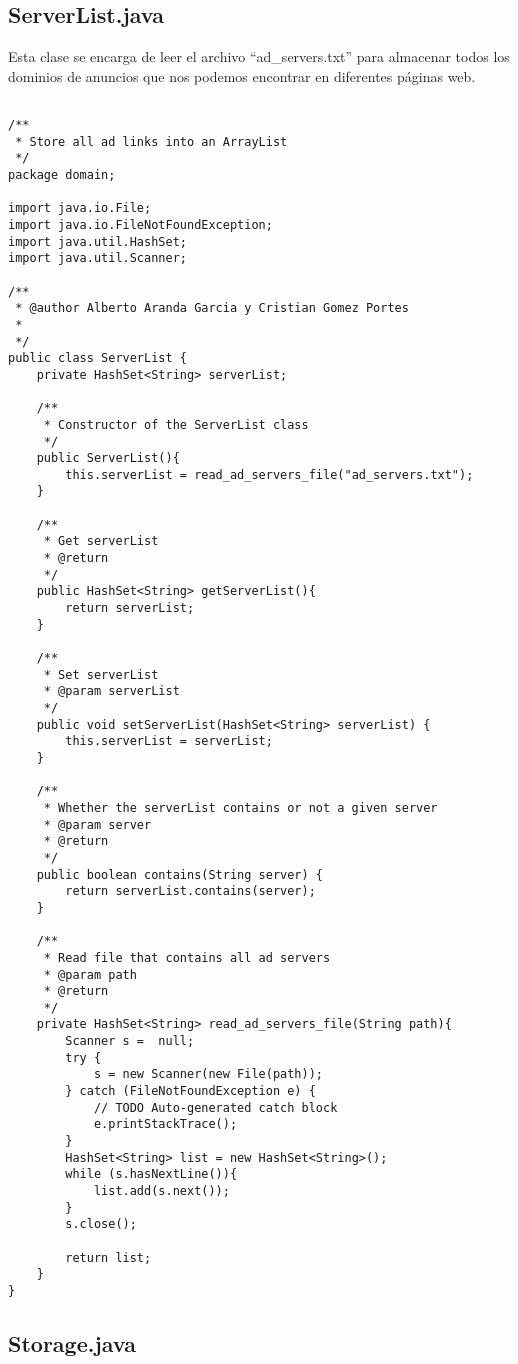 \documentclass{pre-tfg}
\begin{document}
\subsection{ServerList.java}

Esta clase se encarga de leer el archivo ``ad\_servers.txt'' para almacenar todos los dominios de anuncios que nos podemos encontrar
en diferentes páginas web.

\begin{lstlisting}[caption=Código de lectura e inserción de dominios de anuncios,style=java]

/**
 * Store all ad links into an ArrayList
 */
package domain;

import java.io.File;
import java.io.FileNotFoundException;
import java.util.HashSet;
import java.util.Scanner;

/**
 * @author Alberto Aranda Garcia y Cristian Gomez Portes
 *
 */
public class ServerList {
	private HashSet<String> serverList;
	
	/**
	 * Constructor of the ServerList class
	 */
	public ServerList(){
		this.serverList = read_ad_servers_file("ad_servers.txt");
	}
	
	/**
	 * Get serverList
	 * @return
	 */
	public HashSet<String> getServerList(){
		return serverList;
	}
	
	/**
	 * Set serverList
	 * @param serverList
	 */
	public void setServerList(HashSet<String> serverList) {
		this.serverList = serverList;
	}
	
	/**
	 * Whether the serverList contains or not a given server
	 * @param server
	 * @return
	 */
	public boolean contains(String server) {
		return serverList.contains(server);
	}
	
	/**
	 * Read file that contains all ad servers
	 * @param path
	 * @return
	 */
	private HashSet<String> read_ad_servers_file(String path){
		Scanner s =  null;
		try {
			s = new Scanner(new File(path));
		} catch (FileNotFoundException e) {
			// TODO Auto-generated catch block
			e.printStackTrace();
		}
		HashSet<String> list = new HashSet<String>();
		while (s.hasNextLine()){
		    list.add(s.next());
		}
		s.close();
		
		return list;
	}
}

\end{lstlisting}

\subsection{Storage.java}
\end{document}
